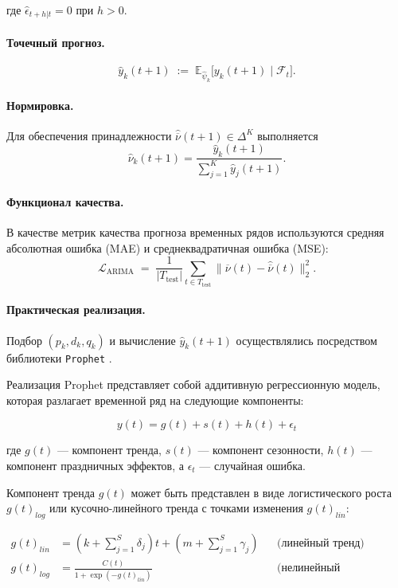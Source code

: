 \documentclass[14pt,a4paper]{article}
\begin{document}
где $\hat{\epsilon}_{t+h|t} = 0$ при $h > 0$.


\paragraph{Точечный прогноз.}
\[
  \widehat{y}_k(t+1)
  \;:=\;
  \mathbb{E}_{\widehat{\psi}_k}\!\bigl[y_k(t+1)\mid\mathcal F_t\bigr].
\]

\paragraph{Нормировка.}
Для обеспечения принадлежности $\widehat{\overline{\nu}}(t+1)\in\Delta^{K}$ выполняется
\[
  \widehat{\nu}_k(t+1)=
  \frac{\widehat{y}_k(t+1)}
       {\displaystyle\sum_{j=1}^{K}\widehat{y}_j(t+1)}.
\]

\paragraph{Функционал качества.}
В качестве метрик качества прогноза временных рядов используются средняя абсолютная ошибка (MAE) и среднеквадратичная ошибка (MSE):
\[
  \mathcal L_{\mathrm{ARIMA}}
  \;=\;
  \frac{1}{|T_{\mathrm{test}}|}
  \sum_{t\in T_{\mathrm{test}}}
  \bigl\|
    \overline{\nu}(t)-\widehat{\overline{\nu}}(t)
  \bigr\|_2^{2}.
\]

\paragraph{Практическая реализация.}
Подбор $(p_k,d_k,q_k)$ и вычисление $\widehat{y}_k(t+1)$  
осуществлялись посредством библиотеки \texttt{Prophet} \cite{prophet}.

Реализация Prophet представляет собой аддитивную регрессионную модель, которая разлагает временной ряд на следующие компоненты:

\begin{equation}
y(t) = g(t) + s(t) + h(t) + \epsilon_t
\end{equation}

где $g(t)$ — компонент тренда, $s(t)$ — компонент сезонности, $h(t)$ — компонент праздничных эффектов, а $\epsilon_t$ — случайная ошибка.

Компонент тренда $g(t)$ может быть представлен в виде логистического роста $g(t)_{log}$ или кусочно-линейного тренда с точками изменения $g(t)_{lin}$:


\begin{align}
g(t)_{lin} &= (k + \sum_{j=1}^S \delta_j)t + (m + \sum_{j=1}^S \gamma_j) &&\text{(линейный тренд)} \\
g(t)_{log} &= \frac{C(t)}{1 + \exp{(-g(t)_{lin})}} &&\text{(нелинейный логистический рост)}
\end{align}
\end{document}
